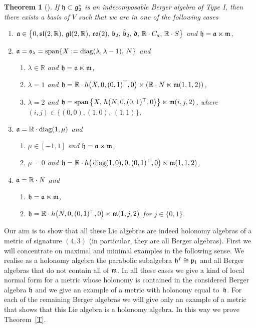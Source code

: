 \documentclass[pdftex]{sigma}
\numberwithin{equation}{section}
\newtheorem{Theorem}{Theorem}[section]
\newcommand\fg{{\frak{g}}}
\newcommand\fh{{\frak h}}
\newcommand\fm{{\frak m}}
\newcommand\fa{{\frak a}}
\newcommand\fb{{\frak b}}
\newcommand\fd{{\frak d}}
\newcommand\fs{{\frak s}}
\newcommand{\fgl}{\mathop{{\frak g \frak l}}}
\newcommand{\fsl}{\mathop{{\frak s \frak l}}}
\newcommand{\fco}{\mathop{{\frak c \frak o}}}
\newcommand\RR{{\mathbb R}}
\newcommand{\Span}{\operatorname{span}}
\newcommand{\diag}{\operatorname{diag}}
\begin{document}
\begin{Theorem}[{{\cite{FK}}}]\label{T1}
If $\fh\subset \fg_2^*$ is an indecomposable Berger algebra of Type I, then there exists a basis of $V$ such that we are in one of the following cases
\begin{enumerate}\itemsep=0pt
\item[$1)$] $\fa\in \big\{0,\fsl(2,\RR),\, \fgl(2,\RR),\, \fco(2),\,\fb_2,\, \hat \fb_2,\, \fd,\,\RR\cdot C_a,\, \RR\cdot S\big\}$ and $\fh=\fa\ltimes \fm$,
\item[$2)$] $\fa=\fs_\lambda=\Span \{X:=\diag(\lambda,\lambda-1),\, N\}$ and
\begin{enumerate}\itemsep=0pt
\item[$a)$] $\lambda\in\RR$ and $\fh=\fa\ltimes \fm$,
\item[$b)$] $\lambda=1$ and $\fh=\RR\cdot h\big(X,0,(0,1)^\top,0\big)\ltimes (\RR\cdot N\ltimes \fm(1,1,2))$,
\item[$c)$] $\lambda=2$ and $\fh=\Span\big\{X,\, h\big(N,0,(0,1)^\top,0\big) \big\}\ltimes\fm(i,j,2)$, where $(i,j)\in\{(0,0),(1,0)$, $(1,1)\}$,
\end{enumerate}
\item[$3)$] $\fa=\RR\cdot\diag(1,\mu)$ and
\begin{enumerate}\itemsep=0pt
\item[$a)$] $\mu\in [-1,1]$ and $\fh=\fa\ltimes \fm$,
\item[$b)$] $\mu=0$ and $\fh=\RR\cdot h\big(\diag(1,0),0,(0,1)^\top,0\big)\ltimes \fm(1,1,2)$,
\end{enumerate}
\item[$4)$] $\fa=\RR\cdot N$ and
\begin{enumerate}\itemsep=0pt
\item[$a)$] $\fh=\fa\ltimes \fm$,
\item[$b)$] $\fh=\RR\cdot h\big(N,0,(0,1)^\top,0\big)\ltimes \fm(1,j,2)$ for $j\in\{0,1\}$.
\end{enumerate}
\end{enumerate}
\end{Theorem}

Our aim is to show that all these Lie algebras are indeed holonomy algebras of a metric of signature $(4,3)$ (in particular, they are all Berger algebras). First we will concentrate on maximal and minimal examples in the following sense. We realise as a holonomy algebra the parabolic subalgebra $\fh^I\cong\frak p_1$ and all Berger algebras that do not contain all of $\fm$. In all these cases we give a kind of local normal form for a metric whose holonomy is contained in the considered Berger algebra $\fh$ and we give an example of a metric with holonomy equal to~$\fh$. For each of the remaining Berger algebras we will give only an example of a metric that shows that this Lie algebra is a holonomy algebra. In this way we prove Theorem~\ref{T}.
\end{document}
